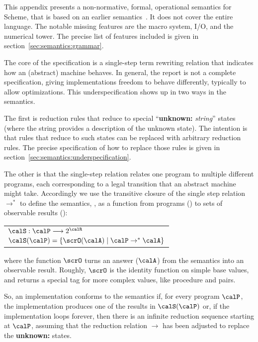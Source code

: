 
This appendix presents a non-normative, formal, operational semantics for Scheme, that is based on an earlier semantics~\cite{mf:scheme-op-sem}. It does not cover the entire language. The notable missing features are the macro system, I/O, and the numerical tower. The precise list of features included is given in section~\ref{sec:semantics:grammar}.

The core of the specification is a single-step term rewriting relation that indicates how an (abstract) machine behaves. In general, the report is not a complete specification, giving implementations freedom to behave differently, typically to allow optimizations. This underspecification shows up in two ways in the semantics. 

The first is reduction rules that reduce to special ``\textbf{unknown:} \textit{string}'' states (where the string provides a description of the unknown state). The intention is that rules that reduce to such states can be replaced with arbitrary reduction rules. The precise specification of how to replace those rules is given in section~\ref{sec:semantics:underspecification}.

The other is that the single-step relation relates one program to
multiple different programs, each corresponding to a legal transition
that an abstract machine might take. Accordingly we use the transitive
closure of the single step relation $\rightarrow^*$ to define the
semantics, \calS, as a function from programs (\calP)
to sets of observable results (\calR):
\begin{center}
\begin{tabular}{l}
$\calS : \calP \longrightarrow 2^{\calR}$ \\
$\calS(\calP) = \{ \scrO(\calA) \mid \calP \rightarrow^* \calA \}$
\end{tabular}
\end{center}
where the function $\scrO$ turns an answer ($\calA$) from the semantics into an observable result. Roughly, $\scrO$ is the identity function on simple base values, and returns a special tag for more complex values, like procedure and pairs.

So, an implementation conforms to the semantics if, for every program $\calP$, the implementation produces one of the results in $\calS(\calP)$ or, if the implementation loops forever, then there is an infinite reduction sequence starting at $\calP$, assuming that the reduction relation $\rightarrow$ has been adjusted to replace the \textbf{unknown:} states.

